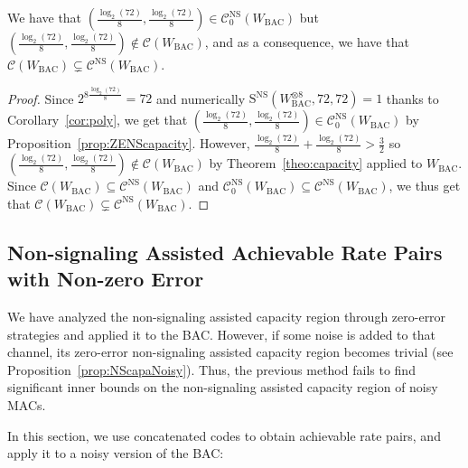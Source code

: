  \begin{theorem}
    \label{theo:BAC}
    We have that $\left(\frac{\log_2(72)}{8},\frac{\log_2(72)}{8}\right) \in \mathcal{C}^{\mathrm{NS}}_0(W_{\mathrm{BAC}})$ but $\left(\frac{\log_2(72)}{8},\frac{\log_2(72)}{8}\right) \not\in \mathcal{C}(W_{\mathrm{BAC}})$, and as a consequence, we have that $\mathcal{C}(W_{\mathrm{BAC}}) \subsetneq \mathcal{C}^{\mathrm{NS}}(W_{\mathrm{BAC}})$.
  \end{theorem}
  \begin{proof}
    Since $2^{8\frac{\log_2(72)}{8}}=72$ and numerically $\mathrm{S}^{\mathrm{NS}}(W^{\otimes 8}_{\mathrm{BAC}},72,72)=1$ thanks to Corollary~\ref{cor:poly}, we get that  $\left(\frac{\log_2(72)}{8},\frac{\log_2(72)}{8}\right) \in \mathcal{C}^{\mathrm{NS}}_0(W_{\mathrm{BAC}})$ by Proposition~\ref{prop:ZENScapacity}. However, $\frac{\log_2(72)}{8}+\frac{\log_2(72)}{8} > \frac{3}{2}$ so $\left(\frac{\log_2(72)}{8},\frac{\log_2(72)}{8}\right) \not\in \mathcal{C}(W_{\mathrm{BAC}})$ by Theorem~\ref{theo:capacity} applied to $W_{\mathrm{BAC}}$. Since $\mathcal{C}(W_{\mathrm{BAC}}) \subseteq \mathcal{C}^{\mathrm{NS}}(W_{\mathrm{BAC}})$ and $\mathcal{C}^{\mathrm{NS}}_0(W_{\mathrm{BAC}}) \subseteq \mathcal{C}^{\mathrm{NS}}(W_{\mathrm{BAC}})$, we thus get that $\mathcal{C}(W_{\mathrm{BAC}}) \subsetneq \mathcal{C}^{\mathrm{NS}}(W_{\mathrm{BAC}})$.
  \end{proof}

  \subsection{Non-signaling Assisted Achievable Rate Pairs with Non-zero Error}
  We have analyzed the non-signaling assisted capacity region through zero-error strategies and applied it to the BAC. However, if some noise is added to that channel, its zero-error non-signaling assisted capacity region becomes trivial (see Proposition~\ref{prop:NScapaNoisy}). Thus, the previous method fails to find significant inner bounds on the non-signaling assisted capacity region of noisy MACs.

  In this section, we use concatenated codes to obtain achievable rate pairs, and apply it to a noisy version of the BAC:

